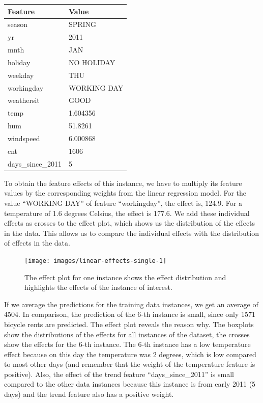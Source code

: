 \documentclass[
  12pt,
]{krantz}
\begin{document}
\begin{tabular}{l|l}
\hline
Feature & Value\\
\hline
season & SPRING\\
\hline
yr & 2011\\
\hline
mnth & JAN\\
\hline
holiday & NO HOLIDAY\\
\hline
weekday & THU\\
\hline
workingday & WORKING DAY\\
\hline
weathersit & GOOD\\
\hline
temp & 1.604356\\
\hline
hum & 51.8261\\
\hline
windspeed & 6.000868\\
\hline
cnt & 1606\\
\hline
days\_since\_2011 & 5\\
\hline
\end{tabular}

To obtain the feature effects of this instance, we have to multiply its feature values by the corresponding weights from the linear regression model.
For the value ``WORKING DAY'' of feature ``workingday'', the effect is, 124.9.
For a temperature of 1.6 degrees Celsius, the effect is 177.6.
We add these individual effects as crosses to the effect plot, which shows us the distribution of the effects in the data.
This allows us to compare the individual effects with the distribution of effects in the data.

\begin{figure}

{\centering \texttt{[image: images/linear-effects-single-1]} 

}

\caption{The effect plot for one instance shows the effect distribution and highlights the effects of the instance of interest.}\label{fig:linear-effects-single}
\end{figure}

If we average the predictions for the training data instances, we get an average of 4504.
In comparison, the prediction of the 6-th instance is small, since only 1571 bicycle rents are predicted.
The effect plot reveals the reason why.
The boxplots show the distributions of the effects for all instances of the dataset, the crosses show the effects for the 6-th instance.
The 6-th instance has a low temperature effect because on this day the temperature was 2 degrees, which is low compared to most other days (and remember that the weight of the temperature feature is positive).
Also, the effect of the trend feature ``days\_since\_2011'' is small compared to the other data instances because this instance is from early 2011 (5 days) and the trend feature also has a positive weight.
\end{document}
